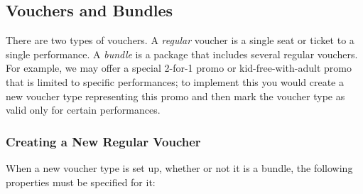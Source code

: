 \subsection{Vouchers and Bundles}
\label{sec:vouchertypes-details}

There are two types of vouchers.  A \emph{regular} voucher is a single
seat or ticket to a single performance.  A \emph{bundle} is a package
that includes several regular vouchers.  For example, we may
offer a special 2-for-1 promo or kid-free-with-adult promo that is
limited to specific performances; to implement this you would create a
new voucher type representing this promo and then mark the voucher type
as valid only for certain performances.

\subsubsection{Creating a New Regular Voucher}
\label{sec:addingregularvouchertypes}

When a new voucher type is set up, whether or not it is a bundle,
the following properties must be specified for it:

